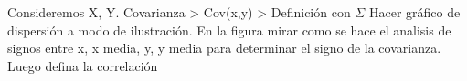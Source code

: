 Consideremos X, Y.
Covarianza > Cov(x,y) > Definición con $\Sigma$
Hacer gráfico de dispersión a modo de ilustración. En la figura mirar como se hace el analisis de signos entre x, x media, y, y media para determinar el signo de la covarianza. Luego defina la correlación
